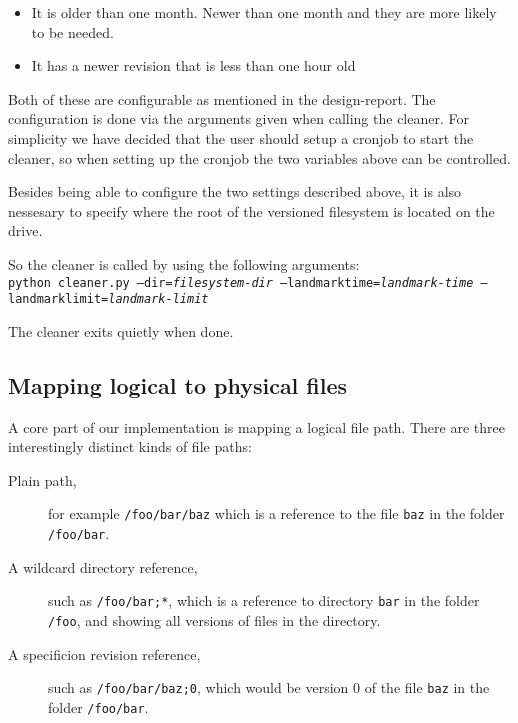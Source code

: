 \documentclass[12pt]{article}
\begin{document}
\begin{itemize}
\item It is older than one month. Newer than one month and they are more likely
to be needed.
\item It has a newer revision that is less than one hour old
\end{itemize}

Both of these are configurable as mentioned in the design-report. The
configuration is done via the arguments given when calling the cleaner. For
simplicity we have decided that the user should setup a cronjob to start the
cleaner, so when setting up the cronjob the two variables above can be controlled.

Besides being able to configure the two settings described above, it is also
nessesary to specify where the root of the versioned filesystem is located on
the drive.

So the cleaner is called by using the following arguments:\\
\texttt{python cleaner.py --dir=\textit{filesystem-dir}
--landmarktime=\textit{landmark-time}
--landmarklimit=\textit{landmark-limit}}

The cleaner exits quietly when done.

\subsection{Mapping logical to physical files}

A core part of our implementation is mapping a logical file path.
There are three interestingly distinct kinds of file paths:

\begin{description}
\item[Plain path,] for example \texttt{/foo/bar/baz} which is a
  reference to the file \texttt{baz} in the folder \texttt{/foo/bar}.
\item[A wildcard directory reference,] such as \texttt{/foo/bar;*},
  which is a reference to directory \texttt{bar} in the folder
  \texttt{/foo}, and showing all versions of files in the directory.
\item[A specificion revision reference,] such as
  \texttt{/foo/bar/baz;0}, which would be version $0$ of the file
  \texttt{baz} in the folder \texttt{/foo/bar}.
\end{description}
\end{document}
